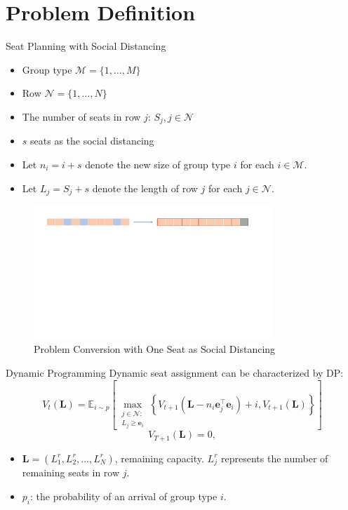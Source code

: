 
\section{Problem Definition}
    \frame{\sectionpage}

    \begin{frame}{Seat Planning with Social Distancing}
      \begin{itemize}
      \item Group type $\mathcal{M} = \{1, \ldots, M\}$
      \item Row $\mathcal{N} = \{1, \ldots, N\}$
      \item The number of seats in row $j$: $S_j, j \in \mathcal{N}$
      \item $s$ seats as the social distancing
      \item Let $n_i = i + s$ denote the new size of group type $i$ for each $i \in \mathcal{M}$.
      \item Let $L_j = S_j + s$ denote the length of row $j$ for each $j \in \mathcal{N}$.
      \end{itemize}
      
      \begin{figure}[ht]
        \centering
        \includegraphics[width = 0.8\textwidth]{./images/dummy_seat.pdf}
        \caption{Problem Conversion with One Seat as Social Distancing}
    \end{figure}
    \end{frame}

    \begin{frame}{Dynamic Programming}
      \centering
      Dynamic seat assignment can be characterized by DP:
      $$V_{t}(\mathbf{L}) = \mathbb{E}_{i \sim p}\left[\max_{\substack{j \in \mathcal{N}: \\ L_j \geqslant \mathbf{e}_{i}}}\left\{V_{t+1}\left(\mathbf{L}- n_{i}\mathbf{e}_j^{\top} \mathbf{e}_{i}\right)+ i, V_{t+1}(\mathbf{L})\right\}\right]$$
      $$V_{T+1}(\mathbf{L}) = 0,$$

      \begin{itemize}
        \item $\mathbf{L} = (L^{r}_1, L^{r}_2, \ldots, L^{r}_{N})$, remaining capacity. $L^{r}_{j}$ represents the number of remaining seats in row $j$.
        \vspace{10pt}
        \item $p_i$: the probability of an arrival of group type $i$.
      \end{itemize}
  \end{frame}

